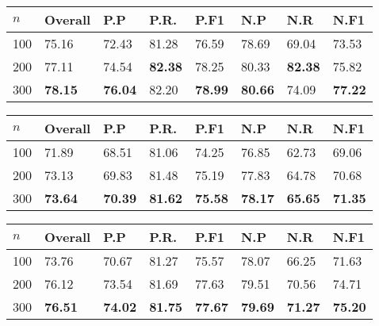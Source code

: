 \documentclass{acm_proc_article-sp}
\begin{document}
\vspace{-3mm}
\tabcolsep=0.11cm
\begin{tabular}{| l | l | l | l | l | l | l | l |}
\hline
$n$ & Overall & P.P & P.R. & P.F1 & N.P & N.R & N.F1 \\ \hline
100 & 75.16 & 72.43 & 81.28 & 76.59 & 78.69 & 69.04 & 73.53 \\ \hline
200 & 77.11 & 74.54 & \bf{82.38} & 78.25 & 80.33 & \bf{82.38} & 75.82 \\ \hline
300 & \bf{78.15} & \bf{76.04} & 82.20 & \bf{78.99} & \bf{80.66} & 74.09 & \bf{77.22} \\ \hline
\end{tabular} 
\pagebreak

\vspace{-3mm}
\tabcolsep=0.11cm
\begin{tabular}{| l | l | l | l | l | l | l | l |}
\hline
$n$ & Overall & P.P & P.R. & P.F1 & N.P & N.R & N.F1 \\ \hline
100 & 71.89 & 68.51 & 81.06 & 74.25 & 76.85 & 62.73 & 69.06 \\ \hline
200 & 73.13 & 69.83 & 81.48 & 75.19 & 77.83 & 64.78 & 70.68 \\ \hline
300 & \bf{73.64} & \bf{70.39} & \bf{81.62} & \bf{75.58} & \bf{78.17} & \bf{65.65} & \bf{71.35} \\ \hline
\end{tabular}

\vspace{-3mm}
\tabcolsep=0.11cm
\begin{tabular}{| l | l | l | l | l | l | l | l |}
\hline
$n$ & Overall & P.P & P.R. & P.F1 & N.P & N.R & N.F1 \\ \hline
100 & 73.76 & 70.67 & 81.27 & 75.57 & 78.07 & 66.25 & 71.63 \\ \hline
200 & 76.12 & 73.54 & 81.69 & 77.63 & 79.51 & 70.56 & 74.71\\ \hline
300 & \bf{76.51} & \bf{74.02} & \bf{81.75} & \bf{77.67} & \bf{79.69} & \bf{71.27} & \bf{75.20} \\ \hline
\end{tabular} 
\end{document}
